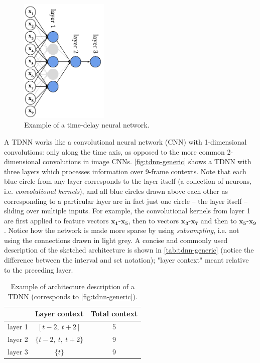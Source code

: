 \documentclass[bsc,frontabs,twoside,singlespacing,parskip,deptreport]{infthesis}
\begin{document}
{{    %
    \begin{figure}[h!t]
      \centering
      \includegraphics[height=6cm]{graphics/tdnn-generic}
      \caption{Example of a time-delay neural network.}
      \label{fig:tdnn-generic}
    \end{figure}
    A TDNN works like a convolutional neural network (CNN) with 1-dimensional convolutions: only along the time axis, as opposed to the more common 2-dimensional convolutions in image CNNs. \autoref{fig:tdnn-generic} shows a TDNN with three layers which processes information over 9-frame contexts. Note that each blue circle from any layer corresponds to the layer itself (a collection of neurons, i.e. \textit{convolutional kernels}), and all blue circles drawn above each other as corresponding to a particular layer are in fact just one circle -- the layer itself -- sliding over multiple inputs. For example, the convolutional kernels from layer 1 are first applied to feature vectors $\mathbf{x_1}$-$\mathbf{x_5}$, then to vectors $\mathbf{x_3}$-$\mathbf{x_7}$ and then to $\mathbf{x_5}$-$\mathbf{x_9}$. Notice how the network is made more sparse by using \textit{subsampling}, i.e. not using the connections drawn in light grey. A concise and commonly used description of the sketched architecture is shown in \autoref{tab:tdnn-generic} (notice the difference between the interval and set notation); "layer context" meant relative to the preceding layer.
    \begin{table}[h!tb]
      \centering
      \begin{sc}
        \begin{tabular}{l|cc}
                      & Layer context      & Total context \\
          \hline
          layer 1     & $[t-2,\ t+2]$      & 5 \\
          layer 2     & $\{t-2,\ t,\ t+2\}$& 9 \\
          layer 3     & $\{t\}$            & 9 \\
        \end{tabular}
      \end{sc}
      \caption{Example of architecture description of a TDNN (corresponds to \autoref{fig:tdnn-generic}).}
      \label{tab:tdnn-generic}
    \end{table}

}}
\end{document}

